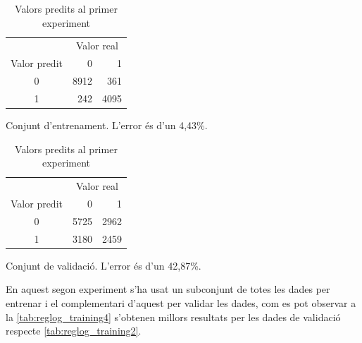 \documentclass[a4paper]{article}
\begin{document}
\begin{table}[H]
	\def\arraystretch{1.5}
	\begin{subtable}[t]{0.49\textwidth}
		\centering
		\begin{tabular}{|c|rr|}
			\hline
			& \multicolumn{2}{c|}{Valor real} \\
			Valor predit & 0 & 1 \\
			\hline
			0 & 8912 & 361 \\
			1 & 242 & 4095 \\
			\hline
		\end{tabular}
		\caption{Conjunt d'entrenament. L'error és d'un 4,43\%.}
		\label{tab:reglog_training1}
	\end{subtable}
	\begin{subtable}[t]{0.49\textwidth}
		\centering
		\begin{tabular}{|c|rr|}
			\hline
			& \multicolumn{2}{c|}{Valor real} \\
			Valor predit & 0 & 1 \\
			\hline
			0 & 5725 & 2962 \\
			1 & 3180 & 2459 \\
			\hline
		\end{tabular}
		\caption{Conjunt de validació. L'error és d'un 42,87\%.}
		\label{tab:reglog_training2}
	\end{subtable}
	\caption{Valors predits al primer experiment}
\end{table}

En aquest segon experiment s'ha usat un subconjunt de totes les dades per entrenar i el complementari d'aquest per validar les dades, com es pot observar a la \autoref{tab:reglog_training4} s'obtenen millors resultats per les dades de validació respecte \autoref{tab:reglog_training2}.
\end{document}
